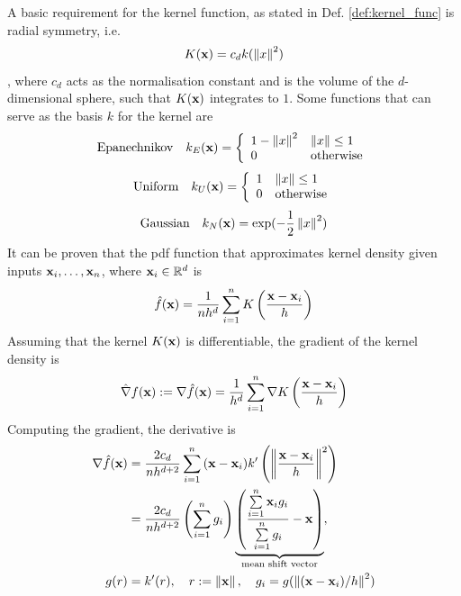 \documentclass[a4paper]{article}
\begin{document}
A basic requirement for the kernel function, as stated in Def. \ref{def:kernel_func} is radial symmetry, i.e.
\begin{equation}
    K(\textbf{x}) = c_d k(\left\lVert x\right\rVert^2)
\end{equation}
, where $c_d$ acts as the normalisation constant and is the volume of the $d$-dimensional sphere, such that $K(\textbf{x})$ integrates to $1$. Some functions that can serve as the basis $k$ for the kernel are
\begin{equation}
        \textup{Epanechnikov}\quad k_E(\textbf{x}) = \left\{
\begin{array}{ll}
      1-\left\lVert x\right\rVert^2 & \left\lVert x\right\rVert \leq 1 \\
      0 & \textrm{otherwise}\\
\end{array} 
\right. 
    \label{eq:ep_kernel}
    \end{equation}
    \begin{equation}
        \textup{Uniform} \quad k_U(\textbf{x}) = \left\{
\begin{array}{ll}
      1 & \left\lVert x\right\rVert \leq 1 \\
      0 & \textrm{otherwise}\\
\end{array} 
\right. 
    \end{equation}
    \begin{equation}
        \textup{Gaussian} \quad k_N(\textbf{x}) = \exp(-\frac{1}{2}\left\lVert x\right\rVert^2)
    \end{equation}
It can be proven that the pdf function that approximates kernel density given inputs $\textbf{x}_i,\ldots, \textbf{x}_n$, where $\textbf{x}_i \in \mathbb{R}^d$ is
\begin{equation}
    \hat{f}(\textbf{x}) = \frac{1}{nh^d}\sum \limits_{i=1}^{n}{K\left(\frac{\textbf{x} -\textbf{x}_i}{h} \right)}
\end{equation}
Assuming that the kernel $K(\textbf{x})$ is differentiable, the gradient of the kernel density is
\begin{equation}
    \hat{\nabla}f(\textbf{x}) := \nabla \hat{f}(\textbf{x}) = \frac{1}{h^d}\sum\limits_{i=1}^{n}{\nabla K\left(\frac{\textbf{x} -\textbf{x}_i}{h} \right)}
\end{equation}
Computing the gradient, the derivative is
\begin{align}
    \nabla \hat{f}(\textbf{x}) &= \frac{2c_d}{nh^{d+2}} \sum \limits_{i=1} ^{n}{(\textbf{x} - \textbf{x}_i) k^{\prime}\left(\left\lVert\frac{\textbf{x} - \textbf{x}_i}{h}\right\rVert^2\right)} \\
    &= \frac{2c_d}{nh^{d+2}}\left(\sum \limits_{i=1}^{n}{g_i} \right) 
    \underbrace{\left( \frac{\sum\limits_{i=1}^{n}{\textbf{x}_i g_i}}{\sum\limits_{i=1}^{n}{g_i}} - \textbf{x}\right)}_{\textup{mean shift vector}} ,\\
    g(r) &= k^{\prime}(r), \quad r := \left\lVert\textbf{x}\right\rVert, \quad g_i = g(\left\lVert(\textbf{x} -\textbf{x}_i)/h\right\rVert^2)
    \label{eq:mean_shift_vector}
\end{align}
\end{document}
